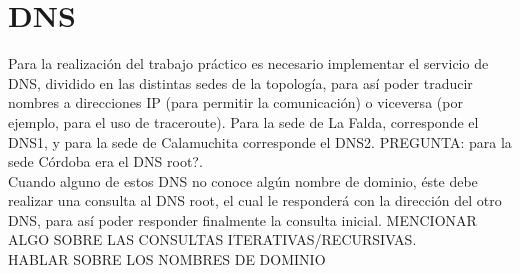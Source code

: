 \section{DNS}

Para la realización del trabajo práctico es necesario implementar el servicio de DNS, dividido en las distintas sedes de la topología, para así poder traducir nombres a direcciones IP (para permitir la comunicación) o viceversa (por ejemplo, para el uso de traceroute). Para la sede de La Falda, corresponde el DNS1, y para la sede de Calamuchita corresponde el DNS2. PREGUNTA: para la sede Córdoba era el DNS root?.\\
Cuando alguno de estos DNS no conoce algún nombre de dominio, éste debe realizar una consulta al DNS root, el cual le responderá con la dirección del otro DNS, para así poder responder finalmente la consulta inicial. MENCIONAR ALGO SOBRE LAS CONSULTAS ITERATIVAS/RECURSIVAS.\\
HABLAR SOBRE LOS NOMBRES DE DOMINIO


